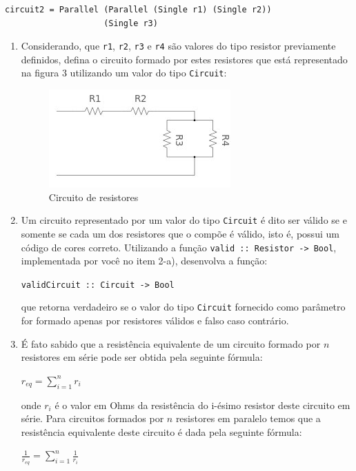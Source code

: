 \documentclass[11pt,a4paper]{article}
\begin{document}
\begin{enumerate}
\begin{verbatim}
circuit2 = Parallel (Parallel (Single r1) (Single r2))
                    (Single r3)
\end{verbatim}
\begin{enumerate}
   \item Considerando, que \texttt{r1}, \texttt{r2}, \texttt{r3} e \texttt{r4} s\~ao valores do tipo resistor previamente definidos, 
        defina o circuito formado por estes resistores que est\'a representado na figura 3 utilizando um valor do tipo \texttt{Circuit}:
\begin{figure}[htp]			
    \centering
    \includegraphics[scale=0.5]{circuit.jpg}
    \caption{Circuito de resistores}
\end{figure}         
   \item Um circuito representado por um valor do tipo \texttt{Circuit} \'e dito ser v\'alido se e somente se cada um dos resistores que o comp\~oe
         \'e v\'alido, isto \'e, possui um c\'odigo de cores correto. Utilizando a fun\c{c}\~ao \texttt{valid :: Resistor -> Bool}, implementada por 
         voc\^e no item 2-a), desenvolva a fun\c{c}\~ao:
         \begin{center}
            \texttt{validCircuit :: Circuit -> Bool}
         \end{center}
         que retorna verdadeiro se o valor do tipo \texttt{Circuit} fornecido como par\^ametro for formado apenas por resistores v\'alidos e falso
         caso contr\'ario.
   \item \'E fato sabido que a resist\^encia equivalente de um circuito formado por $n$ resistores em s\'erie pode ser obtida pela seguinte f\'ormula:
         \begin{center}
         $r_{eq} = \sum_{i=1}^{n}r_{i}$
         \end{center}
         onde $r_{i}$ \'e o valor em Ohms da resist\^encia do i-\'esimo resistor deste circuito em s\'erie. Para circuitos formados por $n$ resistores
         em paralelo temos que a resist\^encia equivalente deste circuito \'e dada pela seguinte f\'ormula:
         \begin{center}
             $\frac{1}{r_{eq}} = \sum_{i=1}^{n}\frac{1}{r_{i}}$

\end{center}
\end{enumerate}
\end{enumerate}
\end{document}
